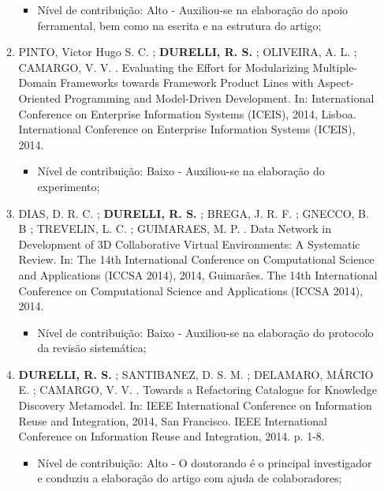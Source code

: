 \begin{itemize}
\begin{enumerate}
		    \begin{itemize}
			        \item Nível de contribuição: Alto - Auxiliou-se na elaboração do apoio ferramental, bem como na escrita e na estrutura do artigo;
			    \end{itemize}
		
		
		\item PINTO, Victor Hugo S. C. ; \textbf{DURELLI, R. S.} ; OLIVEIRA, A. L. ; CAMARGO, V. V. . Evaluating the Effort for Modularizing Multiple-Domain Frameworks towards Framework Product Lines with Aspect-Oriented Programming and Model-Driven Development. In: International Conference on Enterprise Information Systems (ICEIS), 2014, Lisboa. International Conference on Enterprise Information Systems (ICEIS), 2014.
		
		    \begin{itemize}
			        \item Nível de contribuição: Baixo - Auxiliou-se na elaboração do experimento;
			    \end{itemize}
		
		\item DIAS, D. R. C. ; \textbf{DURELLI, R. S.} ; BREGA, J. R. F. ; GNECCO, B. B ; TREVELIN, L. C. ; GUIMARAES, M. P. . Data Network in Development of 3D Collaborative Virtual Environments: A Systematic Review. In: The 14th International Conference on Computational Science and Applications (ICCSA 2014), 2014, Guimarães. The 14th International Conference on Computational Science and Applications (ICCSA 2014), 2014.
		
		    \begin{itemize}
			        \item Nível de contribuição: Baixo - Auxiliou-se na elaboração do protocolo da revisão sistemática;
			    \end{itemize}
		
		\item \textbf{DURELLI, R. S.} ; SANTIBANEZ, D. S. M. ; DELAMARO, MÁRCIO E. ; CAMARGO, V. V. . Towards a Refactoring Catalogue for Knowledge Discovery Metamodel. In: IEEE International Conference on Information Reuse and Integration, 2014, San Francisco. IEEE International Conference on Information Reuse and Integration, 2014. p. 1-8.
		
		    \begin{itemize}
			        \item Nível de contribuição: Alto - O doutorando é o principal investigador e conduziu a elaboração do artigo com ajuda de colaboradores;
			    \end{itemize}
		

\end{enumerate}
\end{itemize}
